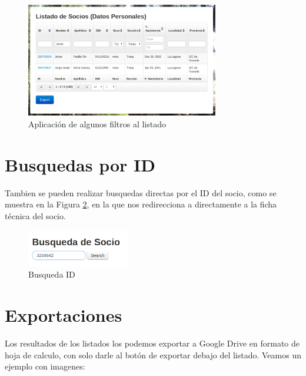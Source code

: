 \begin{figure}[H]
\begin{center}
\includegraphics[width=0.75\textwidth]{images/filtrado.jpg}
\caption{Aplicación de algunos filtros al listado}
\label{fig:listado}
\end{center}
\end{figure}


\section{Busquedas por ID}
\label{3:sec5}

Tambien se pueden realizar busquedas directas por el ID del socio, como se muestra en la Figura \ref{fig:busqueda_id}, en la que nos redirecciona a directamente  a la ficha técnica del socio.\\

\begin{figure}[H]
\begin{center}
\includegraphics[width=0.40\textwidth]{images/busqueda_id.jpg}
\caption{Busqueda ID}
\label{fig:busqueda_id}
\end{center}
\end{figure}

\section{Exportaciones}
\label{3:sec6}

Los resultados de los listados los podemos exportar a Google Drive en formato de hoja de calculo, con solo darle al botón de exportar debajo del listado. Veamos un ejemplo con imagenes:\\

